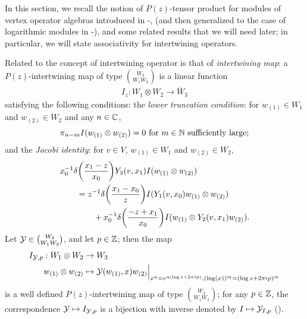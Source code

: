 \documentclass[12pt]{article}
\begin{document}
In this section, we recall the notion of $P(z)$-tensor product for
modules of vertex operator algebras introduced in \cite{HL1}-\cite{HL3},
\cite{H3} (and then generalized to the case of logarithmic
modules in \cite{HLZ1}-\cite{HLZ8}), and some related results that we will need
later; in particular, we will state associativity for intertwining operators.

Related to the concept of intertwining operator is that of \emph{intertwining map}:
a $P(z)$-intertwining map of type $\binom{W_3}{W_1W_2}$ is a linear function
\begin{align*}
  I_z: W_1\otimes W_2 \rightarrow \overline W_3
\end{align*}
satisfying the following conditions: the
\emph{lower truncation condition}: for $w_{(1)} \in W_1$ and $w_{(2)}\in W_2$
and any $n\in \mathbb{C}$,
$$\pi_{n-m}I(w_{(1)}\otimes w_{(2)}) = 0 \text{ for }m\in \mathbb{N} 
  \text{ sufficiently large;}
$$
and the \emph{Jacobi identity}: for $v\in V$, $w_{(1)}\in W_1$ and $w_{(2)}\in W_2$,
\begin{align*}
  &x_0 ^{-1}\delta \bigg( \frac{x_1 -z }{x_0 }\bigg)Y_3(v, x_1)I(w_{(1)}\otimes w_{(2)})\\
    &\qquad = z ^{-1}\delta \bigg( \frac{x_1 -x_0 }{z }\bigg)I(Y_1(v, x_0)w_{(1)}\otimes w_{(2)})\\
      &\qquad \qquad +x_0 ^{-1}\delta \bigg( \frac{-z +x_1 }{x_0 }\bigg)I(w_{(1)}\otimes Y_2(v,x_1)w_{(2)}).
\end{align*}
Let $\mathcal{Y}\in \binom{W_3}{W_1W_2}$, and let $p\in \mathbb{Z}$; then the map
\begin{align*}
  I_{\mathcal{Y},p} : W_1\otimes W_2 &\rightarrow W_3\\
    w_{(1)}\otimes w_{(2)} &\mapsto \mathcal{Y}(w_{(1)}, x)w_{(2)} 
  \Big|_{x^n=e^{n(\log z + 2\pi i p)}, (\log(x))^m = (\log z + 2\pi i p)^m}
\end{align*}
is a well defined $P(z)$-intertwining map of type $\binom{W_3}{W_1W_2}$; for
any $p\in \mathbb{Z}$, the correspondence $\mathcal{Y} \mapsto I_{\mathcal{Y},p}$ is a bijection with
inverse denoted by $I\mapsto \mathcal{Y}_{I,p}$ (\cite{HLZ3}).
\end{document}
